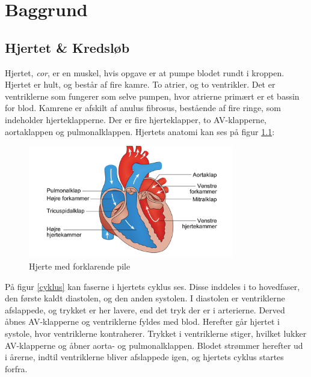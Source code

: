 \chapter{Baggrund}
\section{Hjertet \& Kredsløb}
Hjertet, \textit{cor}, er en muskel, hvis opgave er at pumpe blodet rundt i kroppen. Hjertet er hult, og består af fire kamre. To atrier, og to ventrikler. Det er ventriklerne som fungerer som selve pumpen, hvor atrierne primært er et bassin for blod. Kamrene er afskilt af anulus fibrosus, bestående af fire ringe, som indeholder hjerteklapperne. Der er fire hjerteklapper, to AV-klapperne, aortaklappen og pulmonalklappen. Hjertets anatomi kan ses på figur \ref{Hjeret}:\\

\begin{figure}[H]
	\centering
	\includegraphics[width=0.8\textwidth]{Figurer/Fysio/Hjertet}
	\caption{Hjerte med forklarende pile \protect\cite{Hjertet}}
	\label{Hjeret} 
\end{figure}

På figur \ref{cyklus} kan faserne i hjertets cyklus ses. Disse inddeles i to hovedfaser, den første kaldt diastolen, og den anden systolen. I diastolen er ventriklerne afslappede, og trykket er her lavere, end det tryk der er i arterierne. Derved åbnes AV-klapperne og ventriklerne fyldes med blod. Herefter går hjertet i systole, hvor ventriklerne kontraherer. Trykket i ventriklerne stiger, hvilket lukker AV-klapperne og åbner aorta- og pulmonalklappen. Blodet strømmer herefter ud i årerne, indtil ventriklerne bliver afslappede igen, og hjertets cyklus startes forfra. \cite{cyklus}

